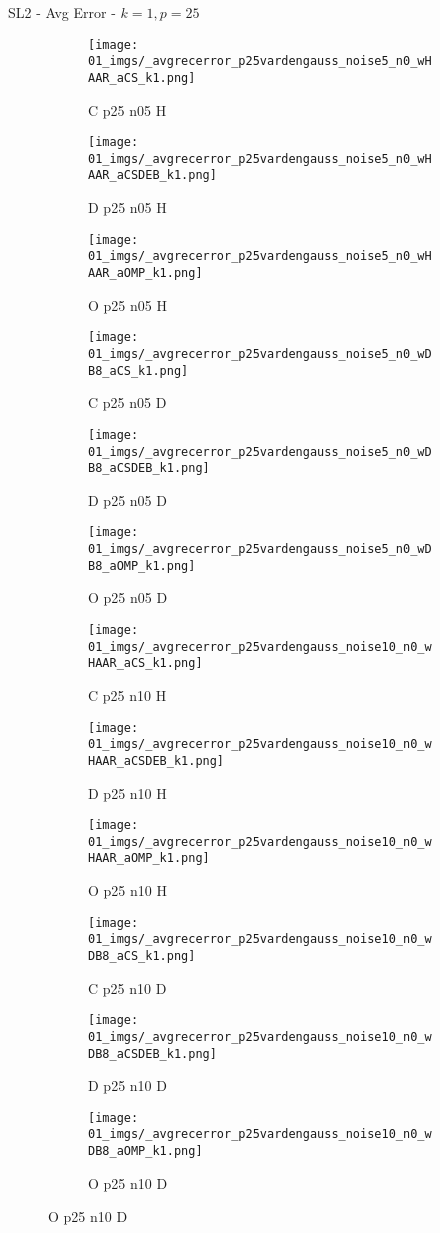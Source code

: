 \begin{frame}{SL2 - Avg Error - $k=1,p=25$}{}
\begin{figure}
\begin{subfigure}{0.13\textwidth}
\texttt{[image: 01\_imgs/\_avgrecerror\_p25vardengauss\_noise5\_n0\_wHAAR\_aCS\_k1.png]}
\caption*{\tiny C p25 n05 H}
\end{subfigure}
\begin{subfigure}{0.13\textwidth}
\texttt{[image: 01\_imgs/\_avgrecerror\_p25vardengauss\_noise5\_n0\_wHAAR\_aCSDEB\_k1.png]}
\caption*{\tiny D p25 n05 H}
\end{subfigure}
\begin{subfigure}{0.13\textwidth}
\texttt{[image: 01\_imgs/\_avgrecerror\_p25vardengauss\_noise5\_n0\_wHAAR\_aOMP\_k1.png]}
\caption*{\tiny O p25 n05 H}
\end{subfigure}
\begin{subfigure}{0.13\textwidth}
\texttt{[image: 01\_imgs/\_avgrecerror\_p25vardengauss\_noise5\_n0\_wDB8\_aCS\_k1.png]}
\caption*{\tiny C p25 n05 D}
\end{subfigure}
\begin{subfigure}{0.13\textwidth}
\texttt{[image: 01\_imgs/\_avgrecerror\_p25vardengauss\_noise5\_n0\_wDB8\_aCSDEB\_k1.png]}
\caption*{\tiny D p25 n05 D}
\end{subfigure}
\begin{subfigure}{0.13\textwidth}
\texttt{[image: 01\_imgs/\_avgrecerror\_p25vardengauss\_noise5\_n0\_wDB8\_aOMP\_k1.png]}
\caption*{\tiny O p25 n05 D}
\end{subfigure}

\vspace{5pt}

\begin{subfigure}{0.13\textwidth}
\texttt{[image: 01\_imgs/\_avgrecerror\_p25vardengauss\_noise10\_n0\_wHAAR\_aCS\_k1.png]}
\caption*{\tiny C p25 n10 H}
\end{subfigure}
\begin{subfigure}{0.13\textwidth}
\texttt{[image: 01\_imgs/\_avgrecerror\_p25vardengauss\_noise10\_n0\_wHAAR\_aCSDEB\_k1.png]}
\caption*{\tiny D p25 n10 H}
\end{subfigure}
\begin{subfigure}{0.13\textwidth}
\texttt{[image: 01\_imgs/\_avgrecerror\_p25vardengauss\_noise10\_n0\_wHAAR\_aOMP\_k1.png]}
\caption*{\tiny O p25 n10 H}
\end{subfigure}
\begin{subfigure}{0.13\textwidth}
\texttt{[image: 01\_imgs/\_avgrecerror\_p25vardengauss\_noise10\_n0\_wDB8\_aCS\_k1.png]}
\caption*{\tiny C p25 n10 D}
\end{subfigure}
\begin{subfigure}{0.13\textwidth}
\texttt{[image: 01\_imgs/\_avgrecerror\_p25vardengauss\_noise10\_n0\_wDB8\_aCSDEB\_k1.png]}
\caption*{\tiny D p25 n10 D}
\end{subfigure}
\begin{subfigure}{0.13\textwidth}
\texttt{[image: 01\_imgs/\_avgrecerror\_p25vardengauss\_noise10\_n0\_wDB8\_aOMP\_k1.png]}
\caption*{\tiny O p25 n10 D}
\end{subfigure}


\end{figure}
\end{frame}
